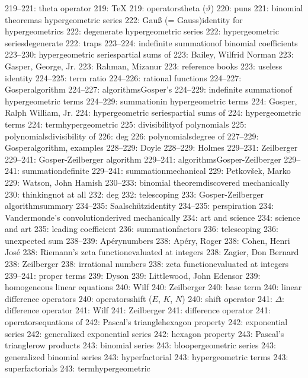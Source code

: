 219--221: theta operator
219: \TeX
219: operators\sub theta ($\vartheta$)
220: puns
221: binomial theorem\sub as hypergeometric series
222: Gau{\ss} (= Gauss)\sub identity for hypergeometrics
222: degenerate hypergeometric series
222: hypergeometric series\sub degenerate
222: traps
223--224: indefinite summation\sub of binomial coefficients
223--230: hypergeometric series\sub partial sums of
223: Bailey, Wilfrid Norman
223: Gasper, George, Jr.
223: Rahman, Mizanur
223: reference books
223: useless identity
224--225: term ratio
224--226: rational functions
224--227: Gosper\sub algorithm
224--227: algorithms\sub Gosper's
224--229: indefinite summation\sub of hypergeometric terms
224--229: summation\sub in hypergeometric terms
224: Gosper, Ralph William, Jr.
224: hypergeometric series\sub partial sums of
224: hypergeometric terms
224: term\sub hypergeometric
225: divisibility\sub of polynomials
225: polynomials\sub divisibility of
226: deg
226: polynomials\sub degree of
227--229: Gosper\sub algorithm, examples
228--229: Doyle
228--229: Holmes
229--231: Zeilberger
229--241: Gosper-Zeilberger algorithm
229--241: algorithms\sub Gosper-Zeilberger
229--241: summation\sub definite
229--241: summation\sub mechanical
229: Petkov\v{s}ek, Marko
229: Watson, John Hamish
230--233: binomial theorem\sub discovered mechanically
230: thinking\sub not at all
232: deg
232: telescoping
233: Gosper-Zeilberger algorithm\sub summary
234--235: Saalsch\"utz\sub identity
234--235: perspiration
234: Vandermonde's convolution\sub derived mechanically
234: art and science
234: science and art
235: leading coefficient
236: summation\sub factors
236: telescoping
236: unexpected sum
238--239: Ap\'ery\sub numbers
238: Ap\'ery, Roger
238: Cohen, Henri Jos\'e
238: Riemann's zeta function\sub evaluated at integers
238: Zagier, Don Bernard
238: Zeilberger
238: irrational numbers
238: zeta function\sub evaluated at integers
239--241: proper terms
239: Dyson
239: Littlewood, John Edensor
239: homogeneous linear equations
240: Wilf
240: Zeilberger
240: base term
240: linear difference operators
240: operators\sub shift ($E$, $K$, $N$)
240: shift operator
241: $\Delta$: difference operator
241: Wilf
241: Zeilberger
241: difference operator
241: operators\sub equations of
242: Pascal's triangle\sub hexagon property
242: exponential series
242: generalized exponential series
242: hexagon property
243: Pascal's triangle\sub row products
243: binomial series
243: bloopergeometric series
243: generalized binomial series
243: hyperfactorial
243: hypergeometric terms
243: superfactorials
243: term\sub hypergeometric
